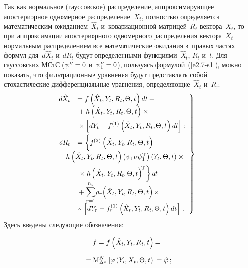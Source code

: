 \begin{multicols}{2}
Так как нормальное (гауссовское) распределение, 
аппроксимирующее апостериорное одномерное распределение~$X_t$, полностью 
определяется математическим ожиданием~$\hat X_t$ и~ковариационной матрицей~$R_t$ 
вектора~$X_t$, то при аппроксимации
апостериорного одномерного распределения вектора~$X_t$ нормальным
распределением все математические ожидания в~правых частях формул
для~$d\hat X_t$ и~$dR_t$ будут определенными
функциями~$\hat X_t$, $R_t$ и~$t$. Для гауссовских МСтС ($\psi'' \hm=0$
и~$\psi_1''\hm=0$), 
пользуясь формулой~(\ref{e2.7-s1}), можно показать, что фильтрационные уравнения будут
представлять собой стохастические дифференциальные уравнения,
определя\-ющие~$\hat X_t$ и~$R_t$:
\begin{equation}
\left.
\begin{array}{rl}
\hspace*{-3mm}d\hat X_t &= f \left(\hat X_t, Y_t,R_t,\Theta, t\right)dt +{}\\
&{}+  h\left(\hat X_t,Y_t, R_t,\Theta, t\right)\times{}\\[6pt]
& {}\times\left[ dY_t - f^{(1)} \left(\hat X_t,Y_t,
    R_t,\Theta, t\right)dt\right]\,; %
\\[6pt]
\hspace*{-3mm}dR_t&=\left\{
\vphantom{\left({\hat X}_t, Y_t,R_t,\Theta, t\right)^{\mathrm{T}}}
 f^{(2)}\left(\hat X_t, Y_t,R_t,\Theta, t\right)-{}\right.\\[6pt]
&\hspace*{-10mm}{}-h\left(\hat
    X_t, Y_t,R_t,\Theta, t\right)\left(\psi_1\nu\psi_1^{\mathrm{T}}\right) 
    \left(Y_t,\Theta, t\right) \times{}\\[6pt]
&\left.{}\times h \left({\hat X}_t, Y_t,R_t,\Theta, t\right)^{\mathrm{\!T}}\right\} dt+{}\\[6pt]
&\displaystyle{}+\sss_{r=1}^{n_y}\! \rho_r \!\left({\hat X}_t,Y_t, R_t,\Theta, t\right)\times{}\\[6pt]
&\hspace*{-1mm}{}\times\left[
    dY_r -f_r^{(1)}\left({\hat X}_t,Y_t, R_t,\Theta, t\right) dt\right]\,.
    \end{array}
    \right\}
    \label{e2.13-s1}
    \end{equation}
Здесь введены следу\-ющие обозначения:

\noindent
    \begin{multline}
    f=f\left(\hat X_t, Y_t,R_t,t\right)={}\\[6pt]
{}=  \mathrm{M}_{\Delta^x}^N \left[ \varphi\left(Y_t,X_t,\Theta, t\right)\right] =\hat{\varphi}\,;
\label{e2.14a-s1}
\end{multline}


\end{multicols}
